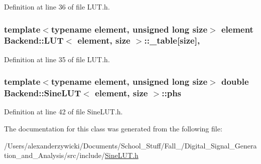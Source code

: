 Definition at line 36 of file L\+U\+T.\+h.

\hypertarget{class_backend_1_1_l_u_t_ae70f3f0c9aaa9e0b85517d8e2c61d9a5}{
\subsubsection[{\+\_\+table}]{\setlength{\rightskip}{0pt plus 5cm}template$<$typename element, unsigned long size$>$ element {\bf Backend\+::\+L\+U\+T}$<$ element, size $>$\+::\+\_\+table\mbox{[}size\mbox{]}\hspace{0.3cm}{\ttfamily [protected]}, {\ttfamily [inherited]}}}\label{class_backend_1_1_l_u_t_ae70f3f0c9aaa9e0b85517d8e2c61d9a5}


Definition at line 35 of file L\+U\+T.\+h.

\hypertarget{class_backend_1_1_sine_l_u_t_af5d1e8bc8bda7d41272c17e0f2e9aad8}{
\subsubsection[{phs}]{\setlength{\rightskip}{0pt plus 5cm}template$<$typename element, unsigned long size$>$ double {\bf Backend\+::\+Sine\+L\+U\+T}$<$ element, size $>$\+::phs\hspace{0.3cm}{\ttfamily [protected]}}}\label{class_backend_1_1_sine_l_u_t_af5d1e8bc8bda7d41272c17e0f2e9aad8}


Definition at line 42 of file Sine\+L\+U\+T.\+h.



The documentation for this class was generated from the following file\+:\begin{DoxyCompactItemize}
\item 
/\+Users/alexanderzywicki/\+Documents/\+School\+\_\+\+Stuff/\+Fall\+\_/\+Digital\+\_\+\+Signal\+\_\+\+Generation\+\_\+and\+\_\+\+Analysis/src/include/\hyperlink{_sine_l_u_t_8h}{Sine\+L\+U\+T.\+h}\end{DoxyCompactItemize}
